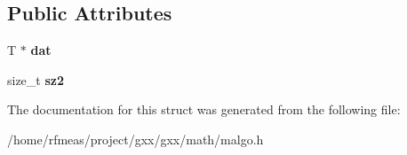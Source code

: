 \subsection*{Public Attributes}
\begin{DoxyCompactItemize}
\item 
T $\ast$ {\bfseries dat}\hypertarget{structmalgo_1_1iterator__matrix__compact_a38dc75445c38482df68e5f7d2564ce89}{}\label{structmalgo_1_1iterator__matrix__compact_a38dc75445c38482df68e5f7d2564ce89}

\item 
size\+\_\+t {\bfseries sz2}\hypertarget{structmalgo_1_1iterator__matrix__compact_a07c156b8d0e138f01a38f1de660c818b}{}\label{structmalgo_1_1iterator__matrix__compact_a07c156b8d0e138f01a38f1de660c818b}

\end{DoxyCompactItemize}


The documentation for this struct was generated from the following file\+:\begin{DoxyCompactItemize}
\item 
/home/rfmeas/project/gxx/gxx/math/malgo.\+h\end{DoxyCompactItemize}
